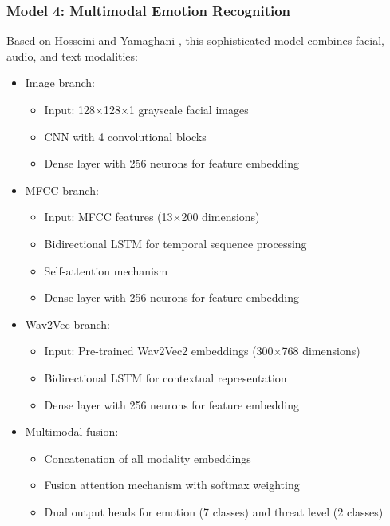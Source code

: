 \documentclass[conference,compsoc]{IEEEtran}
\begin{document}
\subsubsection{Model 4: Multimodal Emotion Recognition}
Based on Hosseini and Yamaghani \cite{hosseini2024}, this sophisticated model combines facial, audio, and text modalities:
\begin{itemize}
    \item Image branch:
        \begin{itemize}
            \item Input: 128×128×1 grayscale facial images
            \item CNN with 4 convolutional blocks
            \item Dense layer with 256 neurons for feature embedding
        \end{itemize}
    \item MFCC branch:
        \begin{itemize}
            \item Input: MFCC features (13×200 dimensions)
            \item Bidirectional LSTM for temporal sequence processing
            \item Self-attention mechanism
            \item Dense layer with 256 neurons for feature embedding
        \end{itemize}
    \item Wav2Vec branch:
        \begin{itemize}
            \item Input: Pre-trained Wav2Vec2 embeddings (300×768 dimensions)
            \item Bidirectional LSTM for contextual representation
            \item Dense layer with 256 neurons for feature embedding
        \end{itemize}
    \item Multimodal fusion:
        \begin{itemize}
            \item Concatenation of all modality embeddings
            \item Fusion attention mechanism with softmax weighting
            \item Dual output heads for emotion (7 classes) and threat level (2 classes)
        \end{itemize}
\end{itemize}
\end{document}
